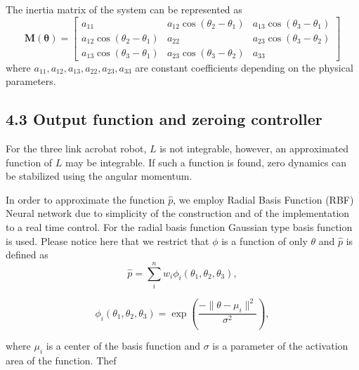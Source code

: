 \documentclass[11pt,a4paper]{article}
\begin{document}
	The inertia matrix of the system can be represented as
	$$ \bm{M}(\bm{\theta}) = 
	\begin{bmatrix}
		a_{11} & a_{12}\cos(\theta_2 - \theta_1) & a_{13}\cos(\theta_3 - \theta_1) \\
		a_{12}\cos(\theta_2 - \theta_1) & a_{22} & a_{23}\cos(\theta_3 - \theta_2) \\
		a_{13}\cos(\theta_3 - \theta_1) & a_{23}\cos(\theta_3 - \theta_2) & a_{33}
	\end{bmatrix}
	$$
	where $a_{11}, a_{12}, a_{13}, a_{22}, a_{23}, a_{33}$ are constant coefficients depending on the physical parameters.
	\subsection*{4.3 Output function and zeroing controller}
	
	For the three link acrobat robot, $L$ is not integrable, however, an approximated function of $L$ may be integrable. If such a function is found, zero dynamics can be stabilized using the angular momentum.
	
	In order to approximate the function $\hat{p}$, we employ Radial Basis Function (RBF) Neural network due to simplicity of the construction and of the implementation to a real time control. For the radial basis function Gaussian type basis function is used. Please notice here that we restrict that $\phi$ is a function of only $\theta$ and $\hat{p}$ is defined as
	\begin{equation}
		\hat{p} = \sum_{i}^{n} w_i \phi_i(\theta_1, \theta_2, \theta_3), \tag{21}
	\end{equation}
	
	\begin{equation}
		\phi_i(\theta_1, \theta_2, \theta_3) = \exp \left( \frac{-\| \theta - \mu_i \|^2}{\sigma^2} \right), \tag{22}
	\end{equation}
	
	where $\mu_i$ is a center of the basis function and $\sigma$ is a parameter of the activation area of the function. Thef
\end{document}
